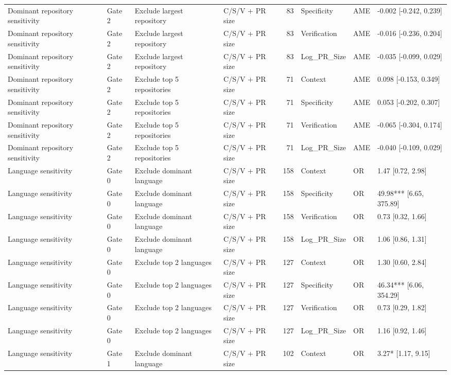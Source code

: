 \begin{table}
\begin{tabular}{llllrlll}
Dominant repository sensitivity & Gate 2 & Exclude largest repository & C/S/V + PR size & 83 & Specificity & AME & -0.002 [-0.242, 0.239] \\
Dominant repository sensitivity & Gate 2 & Exclude largest repository & C/S/V + PR size & 83 & Verification & AME & -0.016 [-0.236, 0.204] \\
Dominant repository sensitivity & Gate 2 & Exclude largest repository & C/S/V + PR size & 83 & Log_PR_Size & AME & -0.035 [-0.099, 0.029] \\
Dominant repository sensitivity & Gate 2 & Exclude top 5 repositories & C/S/V + PR size & 71 & Context & AME & 0.098 [-0.153, 0.349] \\
Dominant repository sensitivity & Gate 2 & Exclude top 5 repositories & C/S/V + PR size & 71 & Specificity & AME & 0.053 [-0.202, 0.307] \\
Dominant repository sensitivity & Gate 2 & Exclude top 5 repositories & C/S/V + PR size & 71 & Verification & AME & -0.065 [-0.304, 0.174] \\
Dominant repository sensitivity & Gate 2 & Exclude top 5 repositories & C/S/V + PR size & 71 & Log_PR_Size & AME & -0.040 [-0.109, 0.029] \\
Language sensitivity & Gate 0 & Exclude dominant language & C/S/V + PR size & 158 & Context & OR & 1.47 [0.72, 2.98] \\
Language sensitivity & Gate 0 & Exclude dominant language & C/S/V + PR size & 158 & Specificity & OR & 49.98*** [6.65, 375.89] \\
Language sensitivity & Gate 0 & Exclude dominant language & C/S/V + PR size & 158 & Verification & OR & 0.73 [0.32, 1.66] \\
Language sensitivity & Gate 0 & Exclude dominant language & C/S/V + PR size & 158 & Log_PR_Size & OR & 1.06 [0.86, 1.31] \\
Language sensitivity & Gate 0 & Exclude top 2 languages & C/S/V + PR size & 127 & Context & OR & 1.30 [0.60, 2.84] \\
Language sensitivity & Gate 0 & Exclude top 2 languages & C/S/V + PR size & 127 & Specificity & OR & 46.34*** [6.06, 354.29] \\
Language sensitivity & Gate 0 & Exclude top 2 languages & C/S/V + PR size & 127 & Verification & OR & 0.73 [0.29, 1.82] \\
Language sensitivity & Gate 0 & Exclude top 2 languages & C/S/V + PR size & 127 & Log_PR_Size & OR & 1.16 [0.92, 1.46] \\
Language sensitivity & Gate 1 & Exclude dominant language & C/S/V + PR size & 102 & Context & OR & 3.27* [1.17, 9.15] \\

\end{tabular}
\end{table}
